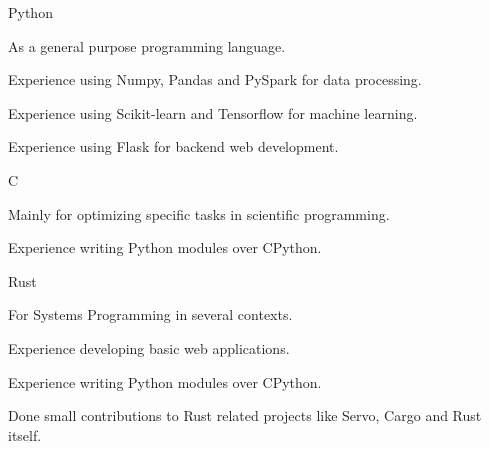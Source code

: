 


\begin{cvskills}


\cvskill
{Python} %
{
  \begin{cvitems}
  \item {As a general purpose programming language.}
  \item {Experience using Numpy, Pandas and PySpark for data processing.}
  \item {Experience using Scikit-learn and Tensorflow for machine learning.}
  \item {Experience using Flask for backend web development.}
  \end{cvitems}
}


\cvskill
{C} %
{
  \begin{cvitems}
  \item {Mainly for optimizing specific tasks in scientific programming.}
  \item {Experience writing Python modules over CPython.}
  \end{cvitems}
}


\cvskill
{Rust} %
{
  \begin{cvitems}
  \item {For Systems Programming in several contexts.}
  \item {Experience developing basic web applications.}
  \item {Experience writing Python modules over CPython.}
  \item {Done small contributions to Rust related projects like Servo, Cargo and Rust itself.}
  \end{cvitems}
}



\end{cvskills}
